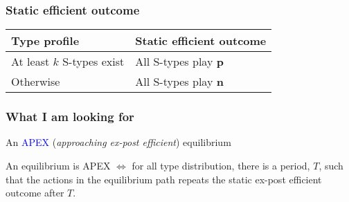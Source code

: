 \documentclass[9pt]{beamer}
\begin{document}
\begin{frame}
  \frametitle{Static efficient outcome}



\begin{table}[h]
\begin{tabular}{ll}
Type profile & Static efficient outcome \\
\hline
At least $k$ S-types exist & All S-types play \textbf{p}  \\
Otherwise &  All S-types play \textbf{n} 
\end{tabular}
\end{table}
\end{frame}




%


\begin{frame}
  \frametitle{What I am looking for}

An \textcolor{blue}{APEX} (\textit{approaching ex-post efficient}) equilibrium

\begin{definition}
An equilibrium is APEX $\Leftrightarrow$ 
for all type distribution, there is a period, $T$, such that the actions in the equilibrium path repeats the static ex-post efficient outcome after $T$.
\end{definition}

\end{frame}
\end{document}
